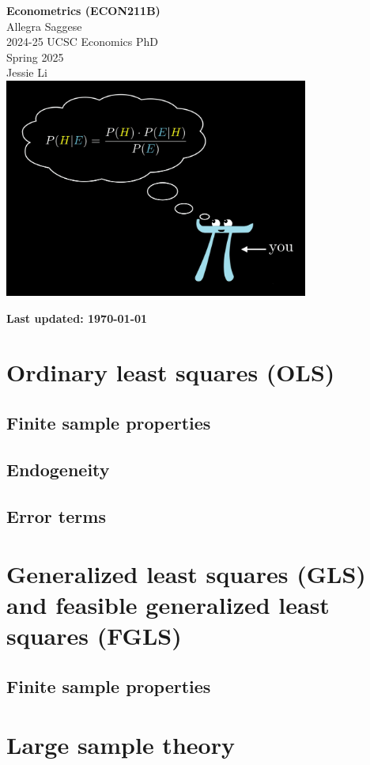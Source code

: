 \documentclass{article}
\begin{document}
\begin{titlepage}
    \centering
    \vspace*{1in} %
    {\LARGE \textbf{Econometrics (ECON211B)}} \\[0.5cm]
    {\LARGE Allegra Saggese} \\ [.5cm]
    {\large 2024-25 UCSC Economics PhD} \\ [1.5 cm]
    {\large Spring 2025} \\[.25cm]
    {\large Jessie Li} \\[.25cm]
    \includegraphics[width=0.75\textwidth]{you-soon.png} %
    \vfill
    \end{titlepage}

\clearpage
\pagestyle{empty} %
\noindent \textbf{Last updated: \today} 
\vspace{0.5cm} %
\tableofcontents
\clearpage %
\pagestyle{plain} %




\section{Ordinary least squares (OLS)}
\subsection{Finite sample properties}

\subsection{Endogeneity}

\subsection{Error terms}



\section{Generalized least squares (GLS) and feasible generalized least squares (FGLS)}

\subsection{Finite sample properties}



\section{Large sample theory}
\end{document}
